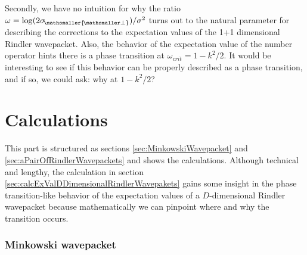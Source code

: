\documentclass[11pt, a4paper]{article}
\newcommand{\om}{\omega}
\newcommand{\si}{{\sigma}}
\let\perptmp\perp
\renewcommand{\perp}{{\! \mathsmaller{\perptmp}}}
\begin{document}
Secondly, we have no intuition for why the ratio $\om=\log(2\si_\perp)/\si^2$ turns out to the natural parameter for describing the corrections to the expectation values of the 1+1 dimensional Rindler wavepacket. Also, the behavior of the expectation value of the number operator hints there is a phase transition at $\om_{crit}=1-k^2/2$. It would be interesting to see if this behavior can be properly described as a phase transition, and if so, we could ask: why at $1-k^2/2$?

\clearpage

\part{Calculations}
This part is structured as sections  \ref{sec:MinkowskiWavepacket} and \ref{sec:aPairOfRindlerWavepackets} and shows the calculations. Although technical and lengthy, the calculation in section \ref{sec:calcExValDDimensionalRindlerWavepakets} gains some insight in the phase transition-like behavior of the expectation values of a $D$-dimensional Rindler wavepacket because mathematically we can pinpoint where and why the transition occurs.  

\section{Minkowski wavepacket}
\label{sec:calcMinkowski}
\end{document}
